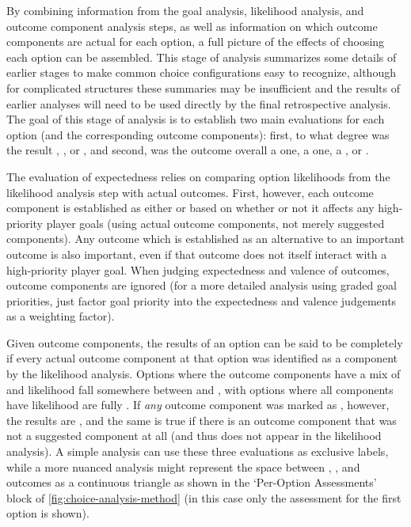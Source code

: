 By combining information from the goal analysis, likelihood analysis, and outcome component analysis steps, as well as information on which outcome components are actual for each option, a full picture of the effects of choosing each option can be assembled.
%
This stage of analysis summarizes some details of earlier stages to make common choice configurations easy to recognize, although for complicated structures these summaries may be insufficient and the results of earlier analyses will need to be used directly by the final retrospective analysis.
%
The goal of this stage of analysis is to establish two main evaluations for each option (and the corresponding outcome components): first, to what degree was the result , , or , and second, was the outcome overall a  one, a  one, a , or .


The evaluation of expectedness relies on comparing option likelihoods from the likelihood analysis step with actual outcomes.
%
First, however, each outcome component is established as either  or  based on whether or not it affects any high-priority player goals (using actual outcome components, not merely suggested components).
%
Any outcome which is established as an alternative to an important outcome is also important, even if that outcome does not itself interact with a high-priority player goal.
%
When judging expectedness and valence of outcomes,  outcome components are ignored (for a more detailed analysis using graded goal priorities, just factor goal priority into the expectedness and valence judgements as a weighting factor).


Given  outcome components, the results of an option can be said to be completely  if every  actual outcome component at that option was identified as a  component by the likelihood analysis.
%
Options where the  outcome components have a mix of  and  likelihood fall somewhere between  and , with options where all  components have  likelihood are fully .
%
If \emph{any}  outcome component was marked as , however, the results are , and the same is true if there is an  outcome component that was not a suggested component at all (and thus does not appear in the likelihood analysis).
%
A simple analysis can use these three evaluations as exclusive labels, while a more nuanced analysis might represent the space between , , and  outcomes as a continuous triangle as shown in the `Per-Option Assessments' block of \cref{fig:choice-analysis-method} (in this case only the assessment for the first option is shown).


